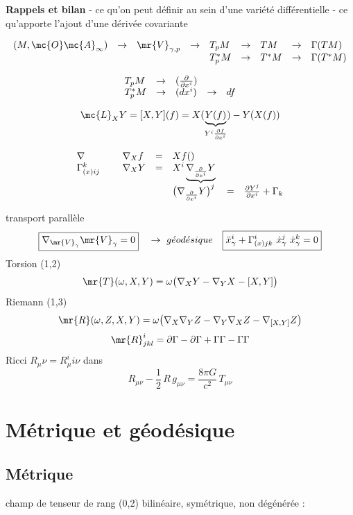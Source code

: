 
{\bf Rappels et bilan}
- ce qu'on peut définir au sein d'une variété différentielle
- ce qu'apporte l'ajout d'une dérivée covariante

\[
\begin{array}{ l c l l l c l l l}
(M, \mc{O} \mc{A}_\infty) & \to & \mr{V}_{\gamma,p} & \to & T_pM & \to & TM & \to & \Gamma(TM) \\
 & &  &  & T^*_pM & \to & T^*M & \to & \Gamma(T^*M) \\
\end{array}
\]

\[
\begin{array}{ l c l l l c l l l}
 T_pM & \to & (\frac{\partial}{\partial x^i}) \\
 T^*_pM & \to & (dx^i) & \to & df \\
\end{array}
\]

\[
\mc{L}_X Y = [X,Y](f) =
X(\underbrace{Y(f)}_{Y^i\frac{\partial f}{\partial x^i}})
- Y(X(f))
\]

\[
\begin{array}{ l c l l l c l l l}
 \nabla & \  & \nabla_X f & = & Xf () \\
 \Gamma^k_{(x)ij} & \  & \nabla_X Y & = & X^i\underbrace{\nabla_{\frac{\partial}{\partial x^i}}Y}{} & \\
 & & & & \big(\nabla_{\frac{\partial}{\partial x^i}}Y\big)^j &
 = & \frac{\partial Y^j}{\partial x^i}+\Gamma_k \\
\end{array}
\]

transport parallèle
\[
\boxed{\nabla_{\mr{V}_\gamma}\mr{V}_\gamma=0}\quad\to\ g\acute{e}od\acute{e}sique
\quad\boxed{\ddot{x}^i_\gamma+\Gamma^i_{(x)jk}
\ \dot{x}^j_\gamma\ \dot{x}^k_\gamma=0}
\]
Torsion (1,2)
\[
\mr{T}(\omega,X,Y)=\omega\big(\nabla_XY-\nabla_YX-[X,Y]\big)
\]
Riemann (1,3)
\[
\mr{R}(\omega,Z,X,Y)=\omega\big(\nabla_X\nabla_YZ-\nabla_Y\nabla_XZ
-\nabla_{[X,Y]}Z\big)
\]
\[
\mr{R}^i_{jkl}=\partial\Gamma-\partial\Gamma+\Gamma\Gamma-\Gamma\Gamma
\]
Ricci $R_\mu\nu=R^i_\mu i\nu$ dans
\[
R_{\mu\nu}-\frac{1}{2}\,R\,g_{\mu\nu}=\frac{8\pi G}{c^2}\,T_{\mu\nu}
\]
\chapter{Métrique et géodésique}%
\section{Métrique}
champ de tenseur de rang (0,2)  bilinéaire, symétrique, non dégénérée :

